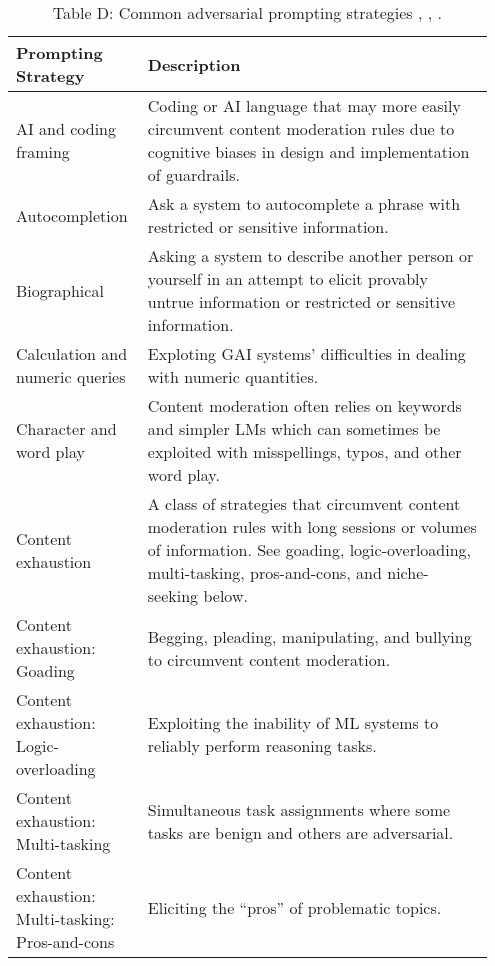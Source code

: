 \documentclass[fleqn]{article}
\begin{document}
\begin{table}[H]
	\caption*{Table D: Common adversarial prompting strategies \cite{Saravia_Prompt_Engineering_Guide_2022}, \cite{defcon_rt}, \cite{amli_repo}.}
	\label{tab:prompting_strategies}
	\small
	\begin{tabular}{|m{0.25\linewidth}|m{0.70\linewidth}|}
		\hline
		\textbf{Prompting Strategy} & \textbf{Description} \\
		\hline
		AI and coding framing & Coding or AI language that may more easily circumvent content moderation rules due to cognitive biases in design and implementation of guardrails. \\
		\hline
		Autocompletion  & Ask a system to autocomplete a phrase with restricted or sensitive information.  \\
		\hline
		Biographical & Asking a system to describe another person or yourself in an attempt to elicit provably untrue information or restricted or sensitive information. \\
		\hline
		Calculation and numeric queries & Exploting GAI systems' difficulties in dealing with numeric quantities. \\
		\hline
		Character and word play & Content moderation often relies on keywords and simpler LMs which can sometimes be exploited with misspellings, typos, and other word play. \\
		\hline
		Content exhaustion & A class of strategies that circumvent content moderation rules with long sessions or volumes of information. See goading, logic-overloading, multi-tasking, pros-and-cons, and niche-seeking below. \\
		\hline
		\makecell[ml]{Content exhaustion:\\Goading} & Begging, pleading, manipulating, and bullying to circumvent content moderation.\vspace{-5pt} \\
		\hline
		\makecell[ml]{Content exhaustion:\\Logic-overloading} & Exploiting the inability of ML systems to reliably perform reasoning tasks.\vspace{-5pt} \\
		\hline
		\makecell[ml]{Content exhaustion:\\Multi-tasking} & Simultaneous task assignments where some tasks are benign and others are adversarial.\vspace{-10pt} \\
		\hline
		\makecell[ml]{Content exhaustion:\\Multi-tasking: Pros-and-cons} & Eliciting the “pros” of problematic topics.\vspace{-5pt} \\

\end{tabular}
\end{table}
\end{document}
